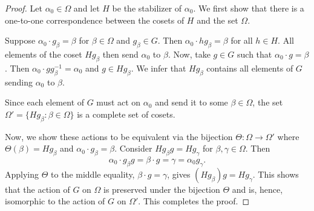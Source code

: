 \documentclass[main.tex]{subfiles}
\begin{document}
\begin{proof}
Let $\alpha_0 \in \Omega$ and let $H$ be the stabilizer of $\alpha_0$. We first show that there is a one-to-one correspondence between the cosets of $H$ and the set $\Omega$.

Suppose $\alpha_0 \cdot g_\beta = \beta$ for $\beta \in \Omega$ and $g_\beta \in G$. Then $\alpha_0 \cdot h g_\beta = \beta$ for all $h \in H$. All elements of the coset $H g_\beta$ then send $\alpha_0$ to $\beta$. Now, take $g \in G$ such that $\alpha_0 \cdot g = \beta$. Then $\alpha_0 \cdot g g_\beta^{-1} = \alpha_0$ and $g \in H g_\beta$. We infer that $H g_\beta$ contains all elements of $G$ sending $\alpha_0 $ to $\beta$.

Since each element of $G$ must act on $\alpha_0$ and send it to some $\beta \in \Omega$, the set $\Omega' = \{H g_\beta : \beta \in \Omega\}$ is a complete set of cosets.

Now, we show these actions to be equivalent via the bijection $\Theta: \Omega \to \Omega'$ where $\Theta(\beta) = H g_\beta$ and $\alpha_0 \cdot g_\beta = \beta$. Consider $H g_\beta g = H g_\gamma$ for $\beta, \gamma \in \Omega$. Then
$$\alpha_0 \cdot g_\beta g = \beta \cdot g = \gamma = \alpha_0 g_\gamma \text{.}$$
Applying $\Theta$ to the middle equality, $\beta \cdot g = \gamma$, gives $(H g_\beta) g = H g_\gamma$. This shows that the action of $G$ on $\Omega$ is preserved under the bijection $\Theta$ and is, hence, isomorphic to the action of $G$ on $\Omega'$. This completes the proof.
\end{proof}
\end{document}
